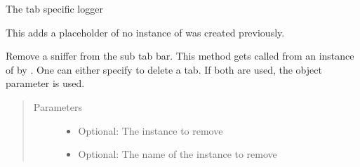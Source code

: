 \documentclass[letterpaper,10pt,english]{sphinxmanual}
\begin{document}
\begin{fulllineitems}
\begin{fulllineitems}
\end{fulllineitems}


\begin{fulllineitems}
\label{\detokenize{src:src.SnifferTab.SnifferTab.logger}}
The tab specific logger

\end{fulllineitems}


\begin{fulllineitems}
\label{\detokenize{src:src.SnifferTab.SnifferTab.prepareUI}}
This adds a placeholder of no instance of {\hyperref[\detokenize{src:src.SnifferTabElement.SnifferTabElement}]{}}
was created previously.

\end{fulllineitems}


\begin{fulllineitems}
\label{\detokenize{src:src.SnifferTab.SnifferTab.removeSniffer}}
Remove a sniffer from the sub tab bar. This method gets called from an instance of
{\hyperref[\detokenize{src:src.SnifferTabElement.SnifferTabElement}]{}} by .
One can either specify    to delete a tab. If both are used,
the object parameter is used.
\begin{quote}\begin{description}
\item[{Parameters}] \leavevmode\begin{itemize}
\item {} 
 \textendash{} Optional: The {\hyperref[\detokenize{src:src.SnifferTabElement.SnifferTabElement}]{}} instance to remove

\item {} 
 \textendash{} Optional: The name of the {\hyperref[\detokenize{src:src.SenderTabElement.SenderTabElement}]{}} instance to remove


\end{itemize}
\end{description}
\end{quote}
\end{fulllineitems}
\end{fulllineitems}
\end{document}
